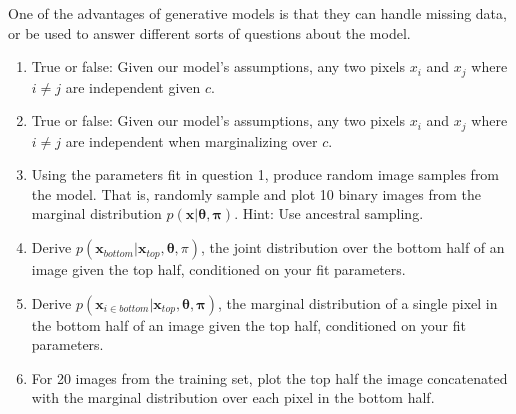 \documentclass{harvardml}
\newcommand{\bx}{\mathbf{x}}
\newcommand{\btheta}{\boldsymbol{\theta}}
\newcommand{\bpi}{\boldsymbol{\pi}}
\theoremstyle{plain}
\begin{document}





\begin{problem}

One of the advantages of generative models is that they can handle missing data, or be used to answer different sorts of questions about the model.

\begin{enumerate}[label=(\alph*)]
\item True or false: Given our model's assumptions, any two pixels $x_i$ and $x_j$ where $i \neq j$ are independent given $c$.
\item True or false: Given our model's assumptions, any two pixels $x_i$ and $x_j$ where $i \neq j$ are independent when marginalizing over $c$.
\item Using the parameters fit in question 1, produce random image samples from the model.  That is, randomly sample and plot 10 binary images from the marginal distribution $p(\bx| \btheta, \bpi)$.  Hint: Use ancestral sampling.
\item Derive $p(\bx_{bottom}|\bx_{top}, \btheta, \pi)$, the joint distribution over the bottom half of an image given the top half, conditioned on your fit parameters.%
\item Derive $p(\bx_{i \in bottom}|\bx_{top}, \btheta, \bpi)$, the marginal distribution of a single pixel in the bottom half of an image given the top half, conditioned on your fit parameters.
\item For 20 images from the training set, plot the top half the image concatenated with the marginal distribution over each pixel in the bottom half.
\end{enumerate}
\end{problem}



\end{document}
